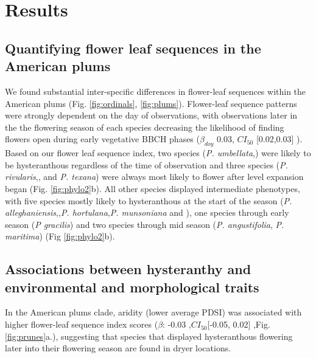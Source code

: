 \documentclass{article}[11pt]
\begin{document}


\section*{Results}
\subsection*{Quantifying flower leaf sequences in the American plums}
We found substantial inter-specific differences in flower-leaf sequences within the American plums (Fig. \ref{fig:ordinals}, \ref{fig:plums}). %
Flower-leaf sequence patterns were strongly dependent on the day of observations, with observations later in the the flowering season of each species decreasing the likelihood of finding flowers open during early vegetative BBCH phases ($\beta_{doy}$ 0.03, $CI_{50}$ [0.02,0.03] ). Based on our flower leaf sequence index, two species (\textit{P. umbellata},) were likely to be hysteranthous regardless of the time of observation and three species (\textit{P. rivularis},, and \textit{P. texana}) were always most likely to flower after level expansion began (Fig. \ref{fig:phylo2}b). All other species displayed intermediate phenotypes, with five species mostly likely to hysteranthous at the start of the season (\textit{P. alleghaniensis},,\textit{P. hortulana},\textit{P. munsoniana} and ), one species through early season (\textit{P gracilis}) and two species through mid season (\textit{P. angustifolia}, \textit{P. maritima}) (Fig \ref{fig:phylo2}b).

\subsection*{Associations between hysteranthy and environmental and morphological traits}
In the American plums clade, aridity (lower average PDSI) was associated with higher flower-leaf sequence index scores ($\beta$: -0.03 ,$CI_{50}$[-0.05,  0.02] ,Fig. \ref{fig:prunes}a.), suggesting that species that displayed hysteranthous flowering later into their flowering season are found in dryer locations. 
\end{document}
